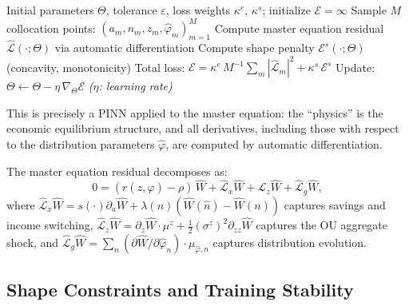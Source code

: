 \documentclass[11pt,a4paper]{report}
\begin{document}
\begin{algorithm}[H]
\caption{EMINN training for the master equation}
\label{alg:eminn}
\begin{algorithmic}
\REQUIRE Initial parameters $\Theta$, tolerance $\varepsilon$, loss weights $\kappa^e$, $\kappa^s$; initialize $\mathcal{E}=\infty$
    \STATE Sample $M$ collocation points: $(a_m, n_m, z_m, \hat{\varphi}_m)_{m=1}^M$
    \STATE Compute master equation residual $\hat{\mathcal{L}}(\cdot;\Theta)$ via automatic differentiation
    \STATE Compute shape penalty $\mathcal{E}^s(\cdot;\Theta)$ (concavity, monotonicity)
    \STATE Total loss: $\mathcal{E} = \kappa^e\,M^{-1}\sum_m |\hat{\mathcal{L}}_m|^2 + \kappa^s\,\mathcal{E}^s$
    \STATE Update: $\Theta \leftarrow \Theta - \eta\,\nabla_\Theta \mathcal{E}$ \;\textit{($\eta$: learning rate)}
\ENDWHILE
\end{algorithmic}
\end{algorithm}

This is precisely a PINN applied to the master equation: the ``physics'' is the economic equilibrium structure, and all derivatives, including those with respect to the distribution parameters $\hat{\varphi}$, are computed by automatic differentiation.

The master equation residual decomposes as:
\begin{equation}
0 = (r(z,\hat{\varphi}) - \rho)\,\hat{W} + \hat{\mathcal{L}}_x\hat{W} + \hat{\mathcal{L}}_z\hat{W} + \hat{\mathcal{L}}_g\hat{W},
\end{equation}
where $\hat{\mathcal{L}}_x\hat{W} = s(\cdot)\partial_a\hat{W} + \lambda(n)(\hat{W}(\hat{n}) - \hat{W}(n))$ captures savings and income switching, $\hat{\mathcal{L}}_z\hat{W} = \partial_z\hat{W}\cdot\mu^z + \frac{1}{2}(\sigma^z)^2\partial_{zz}\hat{W}$ captures the OU aggregate shock, and $\hat{\mathcal{L}}_g\hat{W} = \sum_n (\partial\hat{W}/\partial\hat{\varphi}_n)\cdot\mu_{\hat{\varphi},n}$ captures distribution evolution.

\subsection{Shape Constraints and Training Stability}
\end{document}
